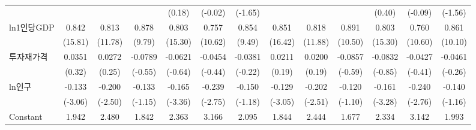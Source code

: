 \begin{table}[htbp]
{\begin{tabular}{l*{12}{c}}
                    &                     &                     &                     &      (0.18)         &     (-0.02)         &     (-1.65)         &                     &                     &                     &      (0.40)         &     (-0.09)         &     (-1.56)         \\
\addlinespace
ln1인당GDP        &       0.842\sym{***}&       0.813\sym{***}&       0.878\sym{***}&       0.803\sym{***}&       0.757\sym{***}&       0.854\sym{***}&       0.851\sym{***}&       0.818\sym{***}&       0.891\sym{***}&       0.803\sym{***}&       0.760\sym{***}&       0.861\sym{***}\\
                    &     (15.81)         &     (11.78)         &      (9.79)         &     (15.30)         &     (10.62)         &      (9.49)         &     (16.42)         &     (11.88)         &     (10.50)         &     (15.30)         &     (10.60)         &     (10.10)         \\
\addlinespace
투자재가격        &      0.0351         &      0.0272         &     -0.0789         &     -0.0621         &     -0.0454         &     -0.0381         &      0.0211         &      0.0200         &     -0.0857         &     -0.0832         &     -0.0427         &     -0.0461         \\
                    &      (0.32)         &      (0.25)         &     (-0.55)         &     (-0.64)         &     (-0.44)         &     (-0.22)         &      (0.19)         &      (0.19)         &     (-0.59)         &     (-0.85)         &     (-0.41)         &     (-0.26)         \\
\addlinespace
ln인구            &      -0.133\sym{***}&      -0.200\sym{**} &      -0.133         &      -0.165\sym{***}&      -0.239\sym{***}&      -0.150         &      -0.129\sym{***}&      -0.202\sym{**} &      -0.120         &      -0.161\sym{***}&      -0.240\sym{***}&      -0.140         \\
                    &     (-3.06)         &     (-2.50)         &     (-1.15)         &     (-3.36)         &     (-2.75)         &     (-1.18)         &     (-3.05)         &     (-2.51)         &     (-1.10)         &     (-3.28)         &     (-2.76)         &     (-1.16)         \\
\addlinespace
Constant            &       1.942\sym{***}&       2.480\sym{***}&       1.842\sym{*}  &       2.363\sym{***}&       3.166\sym{***}&       2.095\sym{*}  &       1.844\sym{***}&       2.444\sym{***}&       1.677         &       2.334\sym{***}&       3.142\sym{***}&       1.993\sym{*}  \\

\end{tabular}}
\end{table}
